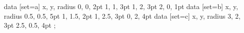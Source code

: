 \begin{codeexample}[width=7cm]
\tikz \datavisualization [
  scientific axes=clean,
  visualize as circle/.list={a, b, c},
  style sheet=strong colors]
data [set=a] {
  x, y, radius
  0, 0, 2pt
  1, 1, 3pt
  1, 2, 3pt
  2, 0, 1pt
}
data [set=b] {
  x, y, radius
  0.5, 0.5, 5pt
  1, 1.5, 2pt
  1, 2.5, 3pt
  0, 2, 4pt
}
data [set=c] {
  x, y, radius
  3, 2, 3pt
  2.5, 0.5, 4pt
};  
\end{codeexample}
